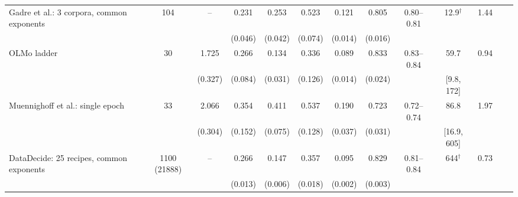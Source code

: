 \begin{landscape}
\begin{table}[!htbp]
\begin{threeparttable}
\begin{tabular}{lcccccccccccc}
Gadre et al.: 3 corpora, common exponents & 104 & -- & 0.231 & 0.253 & 0.523 & 0.121 & 0.805 & 0.80--0.81 & 12.9$^\dagger$ & 1.44 &  &  \\
 &  &  & (0.046) & (0.042) & (0.074) & (0.014) & (0.016) &  &  &  &  &  \\[2pt]
OLMo ladder & 30 & 1.725 & 0.266 & 0.134 & 0.336 & 0.089 & 0.833 & 0.83--0.84 & 59.7 & 0.94 &  &  \\
 &  & (0.327) & (0.084) & (0.031) & (0.126) & (0.014) & (0.024) &  & [9.8, 172] &  &  &  \\[2pt]
Muennighoff et al.: single epoch & 33 & 2.066 & 0.354 & 0.411 & 0.537 & 0.190 & 0.723 & 0.72--0.74 & 86.8 & 1.97 &  &  \\
 &  & (0.304) & (0.152) & (0.075) & (0.128) & (0.037) & (0.031) &  & [16.9, 605] &  &  &  \\[2pt]
DataDecide: 25 recipes, common exponents & 1100 (21888) & -- & 0.266 & 0.147 & 0.357 & 0.095 & 0.829 & 0.81--0.84 & 644$^\dagger$ & 0.73 &  &  \\
 &  &  & (0.013) & (0.006) & (0.018) & (0.002) & (0.003) &  &  &  &  &  \\[2pt]


\end{tabular}
\end{threeparttable}
\end{table}
\end{landscape}
